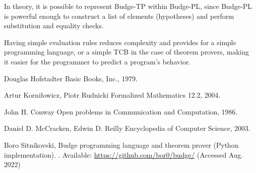 \documentclass{article}
\begin{document}
In theory, it is possible to represent Budge-TP within Budge-PL, since Budge-PL is powerful enough to construct a list of elements (hypotheses) and perform substitution and equality checks.

Having simple evaluation rules reduces complexity and provides for a simple programming language, or a simple TCB in the case of theorem provers, making it easier for the programmer to predict a program's behavior.

\begin{thebibliography}{1}

Douglas Hofstadter
\newblock Basic Books, Inc., 1979.

Artur Korniłowicz, Piotr Rudnicki
\newblock Formalized Mathematics 12.2, 2004.

John H. Conway
\newblock Open problems in Communication and Computation, 1986.

Daniel D. McCracken, Edwin D. Reilly
\newblock Encyclopedia of Computer Science, 2003.

Boro Sitnikovski,
\newblock Budge programming language and theorem prover (Python implementation).
\newblock [Online]. Available: \url{https://github.com/bor0/budge/} (Accessed Aug. 2022)

\end{thebibliography}
\end{document}
